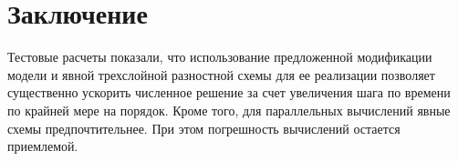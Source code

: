 \section{Заключение}
Тестовые расчеты показали, что использование предложенной модификации модели и явной трехслойной разностной
схемы для ее реализации позволяет существенно ускорить численное решение за счет увеличения шага по времени
по крайней мере на порядок. Кроме того, для параллельных вычислений явные схемы предпочтительнее.
При этом погрешность вычислений остается приемлемой. 